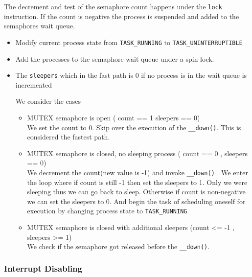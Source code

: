 \documentclass{article}
\begin{document}
The decrement and test of the semaphore count happens under the
\lstinline{lock} instruction. If the count is negative the process is
suspended and added to the semaphores wait queue.

\begin{itemize}


  \item Modify current process state from \lstinline{TASK_RUNNING} to
    \lstinline{TASK_UNINTERRUPTIBLE}

  \item Add the processes to the semaphore wait queue under a spin
    lock.
    
  \item The \lstinline{sleepers} which in the fast path is 0 if no
    process is in the wait queue is incremented
    
    We consider the cases
    \begin{itemize}
    \item MUTEX semaphore is open ( count == 1 sleepers == 0) \\
      
      We set the count to 0. Skip over the execution of the
      \lstinline{__down()}. This is considered the fastest path.

    \item MUTEX semaphore is closed, no sleeping process
      ( count == 0 , sleepers == 0) \\

      We decrement the count(new value is -1) and invoke
      \lstinline{__down()} . We enter the loop where if count is still
      -1 then set the sleepers to 1. Only we were sleeping thus we can
      go back to sleep. Otherwise if count is non-negative we can set
      the sleepers to 0. And begin the task of scheduling oneself for
      execution by changing process state to \lstinline{TASK_RUNNING}

    \item MUTEX semaphore is closed with additional sleepers
      (count  <= -1 , sleepers >= 1) \\
      
      We check if the semaphore got released before the
      \lstinline{__down()}.

      
      
    \end{itemize}
\end{itemize}



\subsubsection{Interrupt Disabling} 
\end{document}
